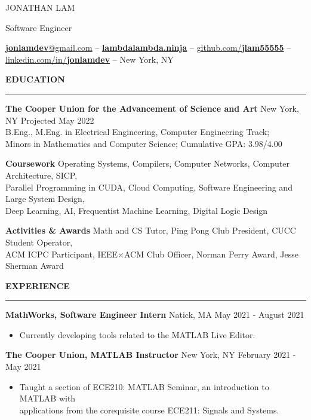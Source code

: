 \documentclass[]{article}
\newcommand{\br}{\vspace{12pt}}
\newcommand{\brs}{\vspace{3pt}}
\newcommand{\hr}{\brs\hrule\brs}
\begin{document}
\thispagestyle{empty}

{\LARGE JONATHAN LAM}

Software Engineer

\href{mailto:jonlamdev@gmail.com}{\textbf{jonlamdev}@gmail.com} --
\href{https://lambdalambda.ninja}{\textbf{lambdalambda.ninja}} --
\href{https://github.com/jlam55555}{github.com/\textbf{jlam55555}} --
\href{https://linkedin.com/in/jonlamdev}{linkedin.com/in/\textbf{jonlamdev}} --
New York, NY

\br
\textbf{EDUCATION}
\hr
\textbf{The Cooper Union for the Advancement of Science and Art}
New York, NY
\hfill
Projected May 2022\\
B.Eng., M.Eng. in Electrical Engineering, Computer Engineering Track;\\
Minors in Mathematics and Computer Science; Cumulative GPA: 3.98/4.00

\brs

\textbf{Coursework} Operating Systems, Compilers, Computer Networks, Computer
Architecture, SICP,\\
Parallel Programming in CUDA, Cloud Computing, Software Engineering and Large
System Design,\\
Deep Learning, AI, Frequentist Machine Learning, Digital Logic Design

\brs

\textbf{Activities \& Awards} Math and CS Tutor, Ping Pong Club President, CUCC
Student Operator, \\ ACM ICPC Participant, IEEE$\times$ACM Club Officer, Norman
Perry Award, Jesse Sherman Award

\br

\textbf{EXPERIENCE}
\hr

\textbf{MathWorks, Software Engineer Intern}
Natick, MA
\hfill
May 2021 - August 2021
\begin{itemize}
\item Currently developing tools related to the MATLAB Live Editor.
\end{itemize}

\brs

\textbf{The Cooper Union, MATLAB Instructor}
New York, NY
\hfill
February 2021 - May 2021
\begin{itemize}
\item Taught a section of ECE210: MATLAB Seminar, an introduction to MATLAB with
  \\ applications from the corequisite course ECE211: Signals and Systems.
\end{itemize}
\end{document}

